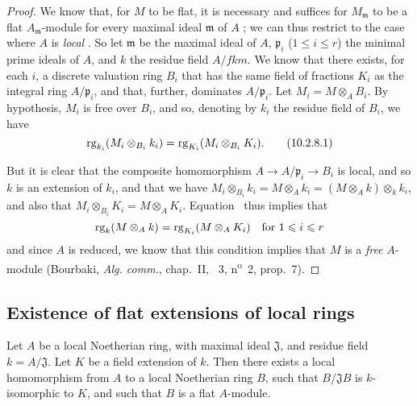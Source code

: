 \begin{proof}
\label{proof-0.10.2.8}
We know that, for $M$ to be flat, it is necessary and suffices for $M_\mathfrak{m}$ to be a flat $A_\mathfrak{m}$-module for every maximal ideal $\mathfrak{m}$ of $A$ ;
we can thus restrict to the case where $A$ is \emph{local} .
So let $\mathfrak{m}$ be the maximal ideal of $A$, $\mathfrak{p}_i$ ($1\leq i\leq r$) the minimal prime ideals of $A$, and $k$ the residue field $A/fk{m}$.
We know  that there exists, for each $i$, a discrete valuation ring $B_i$ that has the same field of fractions $K_i$ as the integral ring $A/\mathfrak{p}_i$, and that, further, dominates $A/\mathfrak{p}_i$.
Let $M_i=M\otimes_A B_i$.
By hypothesis, $M_i$ is free over $B_i$, and so, denoting by $k_i$ the residue field of $B_i$, we have
\[
\label{eq:0.10.2.8.1}
  \operatorname{rg}_{k_i}(M_i\otimes_{B_i}k_i)=\operatorname{rg}_{K_i}(M_i\otimes_{B_i}K_i).
  \tag{10.2.8.1}
\]

But it is clear that the composite homomorphism $A\to A/\mathfrak{p}_i\to B_i$ is local, and so $k$ is an extension of $k_i$, and that we have $M_i\otimes_{B_i}k_i = M\otimes_A k_i = (M\otimes_A k)\otimes_k k_i$, and also that $M_i\otimes_{B_i}K_i = M\otimes_A K_i$.
Equation~ thus implies that
\[
  \operatorname{rg}_k(M\otimes_A k)=\operatorname{rg}_{K_i}(M\otimes_A K_i)\quad\mbox{for $1\leqslant i\leqslant r$}
\]
and since $A$ is reduced, we know that this condition implies that $M$ is a \emph{free} $A$-module (Bourbaki, \emph{Alg. comm.}, chap.~II, \textsection~3, n\textsuperscript{o}~2, prop.~7).
\end{proof}

\subsection{Existence of flat extensions of local rings}
\label{subsection:0.10.3}

\begin{proposition}[10.3.1]
\label{0.10.3.1}
Let $A$ be a local Noetherian ring, with maximal ideal $\mathfrak{J}$, and residue field $k=A/\mathfrak{J}$.
Let $K$ be a field extension of $k$.
Then there exists a local homomorphism from $A$ to a local Noetherian ring $B$, such that $B/\mathfrak{J}B$ is $k$-isomorphic to $K$, and such that $B$ is a flat $A$-module.
\end{proposition}

